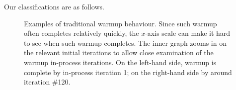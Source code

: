\documentclass[a4paper,UKenglish]{lipics}
\begin{document}
Our classifications are as follows.

\begin{figure}[tbp]
\caption{Examples of traditional warmup behaviour. Since such warmup often completes
relatively quickly, the $x$-axis scale can make it hard to see when such warmup
completes. The inner graph zooms in on the relevant initial iterations to allow
close examination of the warmup in-process iterations. On the left-hand side,
warmup is complete by in-process iteration 1; on the right-hand side by around
iteration \#120.}
\label{fig:examples:trad}
\end{figure}
\end{document}
